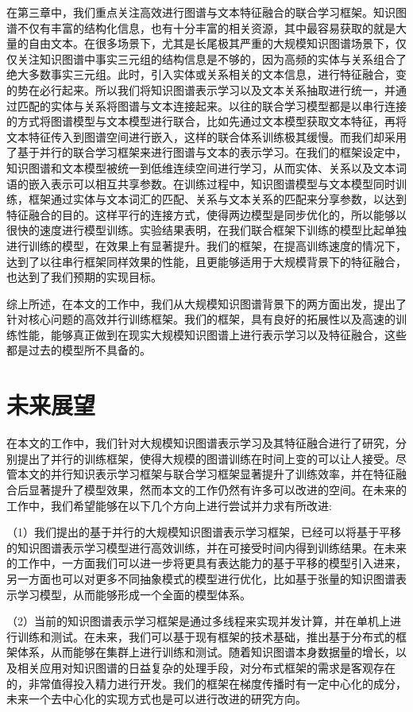 在第三章中，我们重点关注高效进行图谱与文本特征融合的联合学习框架。知识图谱不仅有丰富的结构化信息，也有十分丰富的相关资源，其中最容易获取的就是大量的自由文本。在很多场景下，尤其是长尾极其严重的大规模知识图谱场景下，仅仅关注知识图谱中事实三元组的结构信息是不够的，因为高频的实体与关系组合了绝大多数事实三元组。此时，引入实体或关系相关的文本信息，进行特征融合，变的势在必行起来。所以我们将知识图谱表示学习以及文本关系抽取进行统一，并通过匹配的实体与关系将图谱与文本连接起来。以往的联合学习模型都是以串行连接的方式将图谱模型与文本模型进行联合，比如先通过文本模型获取文本特征，再将文本特征传入到图谱空间进行嵌入，这样的联合体系训练极其缓慢。而我们却采用了基于并行的联合学习框架来进行图谱与文本的表示学习。在我们的框架设定中，知识图谱和文本模型被统一到低维连续空间进行学习，从而实体、关系以及文本词语的嵌入表示可以相互共享参数。在训练过程中，知识图谱模型与文本模型同时训练，框架通过实体与文本词汇的匹配、关系与文本关系的匹配来分享参数，以达到特征融合的目的。这样平行的连接方式，使得两边模型是同步优化的，所以能够以很快的速度进行模型训练。实验结果表明，在我们联合框架下训练的模型比起单独进行训练的模型，在效果上有显著提升。我们的框架，在提高训练速度的情况下，达到了以往串行框架同样效果的性能，且更能够适用于大规模背景下的特征融合，也达到了我们预期的实现目标。

综上所述，在本文的工作中，我们从大规模知识图谱背景下的两方面出发，提出了针对核心问题的高效并行训练框架。我们的框架，具有良好的拓展性以及高速的训练性能，能够真正做到在现实大规模知识图谱上进行表示学习以及特征融合，这些都是过去的模型所不具备的。


\section{未来展望}

在本文的工作中，我们针对大规模知识图谱表示学习及其特征融合进行了研究，分别提出了并行的训练框架，使得大规模的图谱训练在时间上变的可以让人接受。尽管本文的并行知识表示学习框架与联合学习框架显著提升了训练效率，并在特征融合后显著提升了模型效果，然而本文的工作仍然有许多可以改进的空间。在未来的工作中，我们希望能够在以下几个方向上进行尝试并力求有所改进:

（1）我们提出的基于并行的大规模知识图谱表示学习框架，已经可以将基于平移的知识图谱表示学习模型进行高效训练，并在可接受时间内得到训练结果。在未来的工作中，一方面我们可以进一步将更具有表达能力的基于平移的模型引入进来，另一方面也可以对更多不同抽象模式的模型进行优化，比如基于张量的知识图谱表示学习模型，从而能够形成一个全面的模型体系。

（2）当前的知识图谱表示学习框架是通过多线程来实现并发计算，并在单机上进行训练和测试。在未来，我们可以基于现有框架的技术基础，推出基于分布式的框架体系，从而能够在集群上进行训练和测试。随着知识图谱本身数据量的增长，以及相关应用对知识图谱的日益复杂的处理手段，对分布式框架的需求是客观存在的，非常值得投入精力进行开发。我们的框架在梯度传播时有一定中心化的成分，未来一个去中心化的实现方式也是可以进行改进的研究方向。

